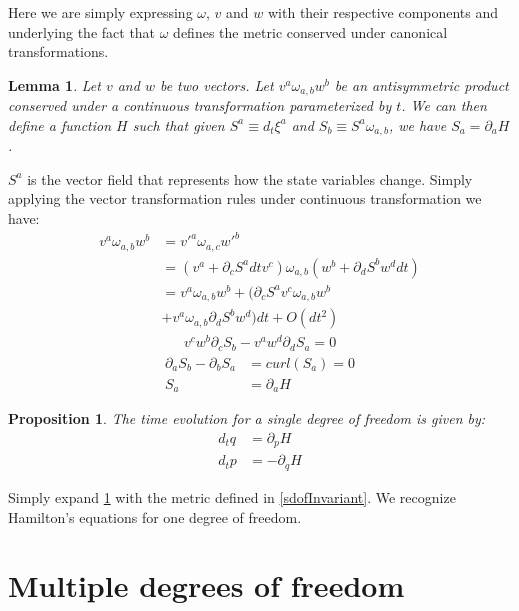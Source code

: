 \documentclass[aps,pra,10pt,twocolumn,floatfix,nofootinbib]{revtex4-1}
\newtheorem{lem}[thm]{Lemma}
\newtheorem{prop}[thm]{Proposition}
\theoremstyle{definition}
\begin{document}
Here we are simply expressing $\omega$, $v$ and $w$ with their respective components and underlying the fact that $\omega$ defines the metric conserved under canonical transformations.

\begin{lem}\label{genAntisim}
Let $v$ and $w$ be two vectors. Let $v^{a} \omega_{a, b} w^{b}$ be an antisymmetric product conserved under a continuous transformation parameterized by $t$. We can then define a function $H$ such that given $S^{a} \equiv d_{t}\xi^{a}$ and $S_{b} \equiv S^{a} \omega_{a, b}$, we have $S_{a} = \partial_{a}H$.
\end{lem}

$S^{a}$ is the vector field that represents how the state variables change. Simply applying the vector transformation rules under continuous transformation we have:
\begin{align*}
v^{a} \omega_{a, b} w^{b} &= v'^{a} \omega_{a, c} w'^{b}  \\
&= (v^{a} + \partial_{c} S^{a} dt v^{c}) \omega_{a, b} ( w^{b} + \partial_{d} S^{b} w^{d} dt) \\
&= v^{a} \omega_{a, b} w^{b} + (\partial_{c} S^{a} v^{c} \omega_{a, b} w^{b} \\
 &+ v^{a} \omega_{a, b} \partial_{d} S^{b} w^{d}) dt + O(dt^2)
\end{align*}
\begin{align*}
v^{c} w^{b} \partial_{c} S_{b} - v^{a} w^{d} \partial_{d} S_{a} = 0
\end{align*}
\begin{align*}
\partial_{a} S_{b} - \partial_{b} S_{a} &= curl(S_{a}) = 0 \\
S_{a} &= \partial_{a}H
\end{align*}

\begin{prop}\label{sdofHam}
The time evolution for a single degree of freedom is given by:
\begin{align*}
d_{t}q &= \partial_{p} H \\
d_{t}p &= - \partial_{q} H
\end{align*}
\end{prop}

Simply expand \ref{genAntisim} with the metric defined in \ref{sdofInvariant}. We recognize Hamilton's equations for one degree of freedom\cite{classical_dynamics}.

\section{Multiple degrees of freedom}
\end{document}
